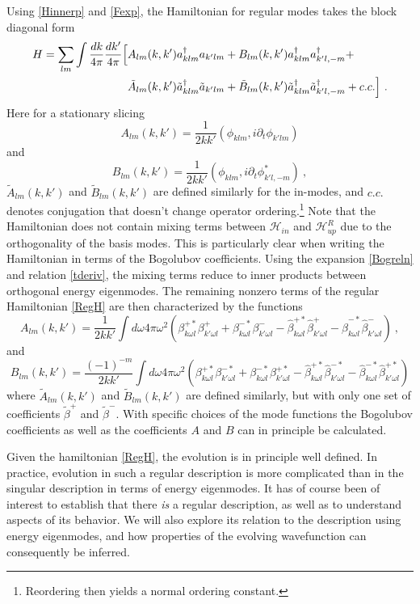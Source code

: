 \documentclass[12pt]{article}
\numberwithin{equation}{section}
\newcommand{\beq}{\begin{equation}}
\newcommand{\eeq}{\end{equation}}
\begin{document}
Using \eqref{Hinnerp} and \eqref{Fexp}, the Hamiltonian for regular modes takes the block diagonal form 
\beq\label{RegH}
\begin{split}
H= \sum_{lm} \int \frac{dk}{4 \pi }  \frac{dk'}{4 \pi }  \Bigl[&A_{lm}(k, k') a_{k lm}^{\dagger}a_{k'lm} + B_{lm}(k, k') a^{\dagger}_{k lm}a^{\dagger}_{k'l,-m} + \\ 
&\tilde{A}_{lm}(k, k')\tilde a_{k lm}^{\dagger}\tilde a_{k'lm}+\tilde{B}_{lm}(k, k')\tilde a^{\dagger}_{k lm}\tilde a^{\dagger}_{k'l,-m}  + c.c.\Bigr] \ .
\end{split}
\eeq 
Here for a stationary slicing
\beq
A_{lm}(k, k') = \frac{1}{2kk'} (\phi_{klm}, i\partial_t \phi_{k'lm})
\eeq 
and
\beq
B_{lm}(k, k') = \frac{1}{2kk'} ( \phi_{klm}, i\partial_t \phi^*_{k'l,-m})\ ,
\eeq 
 $\tilde{A}_{lm}(k, k')$ and $\tilde{B}_{lm}(k, k')$ are defined similarly for the in-modes, and $c.c.$ denotes conjugation that doesn't change operator ordering.\footnote{Reordering then yields a normal ordering constant.}
 Note that the Hamiltonian does not contain mixing terms between $\mathcal{H}_{in}$ and $\mathcal{H}^R_{up}$
due to the orthogonality of the basis modes. This is particularly clear when writing the Hamiltonian in terms of the Bogolubov coefficients. Using the expansion \eqref{Bogreln} and relation \eqref{tderiv}, the mixing terms reduce to inner products between orthogonal energy eigenmodes. The remaining nonzero terms of the regular Hamiltonian \eqref{RegH} are then characterized by the functions
\beq
A_{lm}(k, k') =\frac{1}{2kk'} \int d\omega  4\pi \omega^2 (\beta^{+*}_{k\omega l} \beta^+_{k'\omega l}+ \beta^{-*}_{k\omega l} \beta^-_{k'\omega l} - \hat \beta^{+*}_{k\omega l} \hat\beta^+_{k'\omega l}- \hat \beta^{-*}_{k\omega l} \hat \beta^-_{k'\omega l})\ ,
\eeq 
and
\beq
B_{lm}(k, k') =  \frac{(-1)^{-m}}{2kk'}\int d\omega4\pi \omega^2 (\beta^{+*}_{k\omega l} \beta^{-*}_{k'\omega l}+ \beta^{-*}_{k\omega l} \beta^{+*}_{k'\omega l} - \hat \beta^{+*}_{k\omega l} \hat\beta^{-*}_{k'\omega l}- \hat \beta^{-*}_{k\omega l} \hat \beta^{+*}_{k'\omega l})
\eeq 
where $\tilde{A}_{lm}(k, k')$ and $\tilde{B}_{lm}(k, k')$ are defined similarly, but with only one set of coefficients $\tilde\beta^+$ and $\tilde{\beta}^-$.  With specific choices of the mode functions the Bogolubov coefficients as well as the coefficients $A$ and $B$ can in principle be calculated.

Given the hamiltonian \eqref{RegH},  the evolution is in principle well defined.  In practice, evolution in such a regular description is more complicated than in the singular description in terms of energy eigenmodes.  It has of course been of interest to establish that there {\it is} a regular description, as well as to understand aspects of its behavior.  We will also explore its relation to the description using energy eigenmodes, and how properties of the evolving wavefunction can consequently be inferred.
\end{document}
